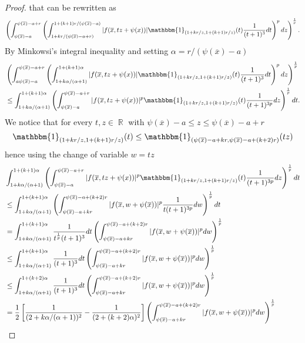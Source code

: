 \documentclass[12pt]{article}
\theoremstyle{definition}
\DeclareMathOperator\rr{\mathbb{R}}
\begin{document}
\begin{proof}
that can be rewritten as
 \[  \left( \int_{\psi(\overline x) -a}^{\psi(\overline x) -a+r}\left (\int_{1+kr/(\psi(\overline x) -a+r)}^{1+(k+1)r/(\psi(\overline x)-a)} |f(\overline x, tz+\psi(x))|\mathbbm{1}_{(1+kr/z,  1+(k+1)r/z ) }(t)\frac{1}{(t+1)^3}dt\right)^pdz \right)^{\frac{1}{p}}.\]
 By Minkowsi's integral inequality and setting $\alpha=r/(\psi(\overline x)-a)$
 \begin{align*}
  & \left( \int_{a\psi(\overline x) -a}^{\psi(\overline x) -a+r}\left (\int_{1+k\alpha/(\alpha+1)}^{1+(k+1)\alpha} |f(\overline x, tz+\psi(x))|\mathbbm{1}_{(1+kr/z,  1+(k+1)r/z ) }(t)\frac{1}{(t+1)^3}dt\right)^pdz \right)^{\frac{1}{p}} \\
  &\le \int_{1+k\alpha/(\alpha+1)}^{1+(k+1)\alpha} \left ( \int_{\psi(\overline x) -a}^{\psi(\overline x) -a+r}|f(\overline x, tz+\psi(x))|^p\mathbbm{1}_{(1+kr/z,  1+(k+1)r/z ) }(t)\frac{1}{(t+1)^{3p}} dz \right) ^{\frac{1}{p}}dt.  
 \end{align*}
 We notice that for every $t,z \in \rr$ with $\psi(\overline x) -a \le z \le \psi(\overline x)-a+r$
 \[ \mathbbm{1}_{(1+kr/z,  1+(k+1)r/z ) }(t) \le \mathbbm{1}_{(\psi(\overline x)-a+kr, \psi(\overline x) - a+(k+2)r)}(tz)   \]
 hence using the change of variable $w=tz$
 \begin{align*}
 &\int_{1+k\alpha/(\alpha+1)}^{1+(k+1)\alpha} \left ( \int_{\psi(\overline x) -a}^{\psi(\overline x) -a+r}|f(\overline x, tz+\psi(x))|^p\mathbbm{1}_{(1+kr/z,  1+(k+1)r/z ) }(t)\frac{1}{(t+1)^{3p}} dz \right) ^{\frac{1}{p}}dt \\
&\le \int_{1+k\alpha/(\alpha+1)}^{1+(k+1)\alpha} \left ( \int_{\psi(\overline x)-a+kr}^{\psi(\overline x)-a+(k+2)r}|f(\overline x, w+\psi(\overline x))|^p \frac{1}{t(t+1)^{3p}} dw \right) ^{\frac{1}{p}}dt\\
&=\int_{1+k\alpha/(\alpha+1)}^{1+(k+1)\alpha}\frac{1}{t^{\frac{1}{p}}(t+1)^{3}}dt \left ( \int_{\psi(\overline x)-a+kr}^{\psi(\overline x)-a+(k+2)r}|f(\overline x, w+\psi(\overline x))|^p  dw \right) ^{\frac{1}{p}}\\
&\le \int_{1+k\alpha/(\alpha+1)}^{1+(k+1)\alpha}\frac{1}{(t+1)^{3}}dt \left ( \int_{\psi(\overline x)-a+kr}^{\psi(\overline x)-a+(k+2)r}|f(\overline x, w+\psi(\overline x))|^p  dw \right)^{\frac{1}{p}}\\
&\le \int_{1+k\alpha/(\alpha+1)}^{1+(k+2)\alpha}\frac{1}{(t+1)^{3}}dt \left ( \int_{\psi(\overline x)-a+kr}^{\psi(\overline x)-a+(k+2)r}|f(\overline x, w+\psi(\overline x))|^p  dw \right)^{\frac{1}{p}}\\
&= \frac{1}{2}\left[\frac{1}{(2+k\alpha/(\alpha+1))^2} -\frac{1}{(2+(k+2)\alpha)^2}\right] \left ( \int_{\psi(\overline x)-a+kr}^{\psi(\overline x)-a+(k+2)r}|f(\overline x, w+\psi(\overline x))|^p  dw \right) ^{\frac{1}{p}}\\

\end{align*}
\end{proof}
\end{document}
